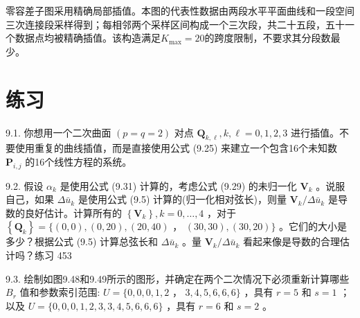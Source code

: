 \documentclass[../main.tex]{subfiles}
\begin{document}
零容差子图采用精确局部插值。本图的代表性数据由两段水平平面曲线和一段空间三次连接段采样得到；每相邻两个采样区间构成一个三次段，共二十五段，五十一个数据点均被精确插值。该构造满足$K_{\max}=20$的跨度限制，不要求其分段数最少。

\section*{练习}

9.1. 你想用一个二次曲面 \(\left( {p = q = 2}\right)\) 对点 \({\mathbf{Q}}_{k,\ell },k,\ell  = 0,1,2,3\) 进行插值。不要使用重复的曲线插值，而是直接使用公式 (9.25) 来建立一个包含16个未知数 \({\mathbf{P}}_{i,j}\) 的16个线性方程的系统。

9.2. 假设 \({\alpha }_{k}\) 是使用公式 (9.31) 计算的，考虑公式 (9.29) 的未归一化 \({\mathbf{V}}_{k}\) 。说服自己，如果 \(\Delta {\bar{u}}_{k}\) 是使用公式 (9.5) 计算的(归一化相对弦长)，则量 \({\mathbf{V}}_{k}/\Delta {\bar{u}}_{k}\) 是导数的良好估计。计算所有的 \(\left\{  {\mathbf{V}}_{k}\right\}  ,k = 0,\ldots ,4\) ，对于 \(\left\{  {\mathbf{Q}}_{k}\right\}   = \{ \left( {0,0}\right) ,\left( {0,{20}}\right) ,\left( {{20},{40}}\right)\) ， \(\left( {{30},{30}}\right) ,\left( {{30},{20}}\right) \}\) 。它们的大小是多少？根据公式 (9.5) 计算总弦长和 \(\Delta {\bar{u}}_{k}\) 。量 \({\mathbf{V}}_{k}/\Delta {\bar{u}}_{k}\) 看起来像是导数的合理估计吗？练习 453

9.3. 绘制如图9.48和9.49所示的图形，并确定在两个二次情况下必须重新计算哪些 \({B}_{r}\) 值和参数索引范围: \(U = \{ 0,0,0,1,2\) ， \(3,4,5,6,6,6\}\) ，具有 \(r = 5\) 和 \(s = 1\) ；以及 \(U = \{ 0,0,0,1,2,3,3,4,5,6,6,6\}\) ，具有 \(r = 6\) 和 \(s = 2\) 。


\clearpage
\end{document}

